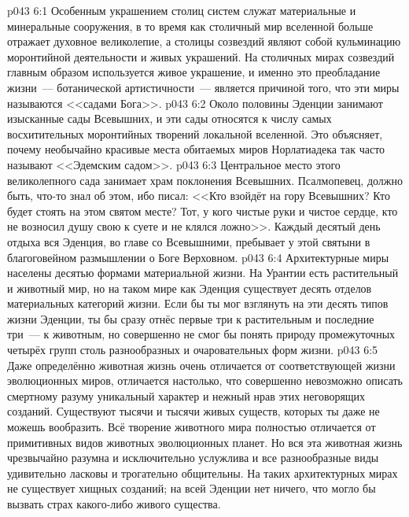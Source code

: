 \vs p043 6:1 Особенным украшением столиц систем служат материальные и минеральные сооружения, в то время как столичный мир вселенной больше отражает духовное великолепие, а столицы созвездий являют собой кульминацию моронтийной деятельности и живых украшений. На столичных мирах созвездий главным образом используется живое украшение, и именно это преобладание жизни~--- ботанической артистичности~--- является причиной того, что эти миры называются <<садами Бога>>.
\vs p043 6:2 \pc Около половины Эденции занимают изысканные сады Всевышних, и эти сады относятся к числу самых восхитительных моронтийных творений локальной вселенной. Это объясняет, почему необычайно красивые места обитаемых миров Норлатиадека так часто называют <<Эдемским садом>>.
\vs p043 6:3 Центральное место этого великолепного сада занимает храм поклонения Всевышних. Псалмопевец, должно быть, что-то знал об этом, ибо писал: <<Кто взойдёт на гору Всевышних? Кто будет стоять на этом святом месте? Тот, у кого чистые руки и чистое сердце, кто не возносил душу свою к суете и не клялся ложно>>. Каждый десятый день отдыха вся Эденция, во главе со Всевышними, пребывает у этой святыни в благоговейном размышлении о Боге Верховном.
\vs p043 6:4 \pc Архитектурные миры населены десятью формами материальной жизни. На Урантии есть растительный и животный мир, но на таком мире как Эденция существует десять отделов материальных категорий жизни. Если бы ты мог взглянуть на эти десять типов жизни Эденции, ты бы сразу отнёс первые три к растительным и последние три~--- к животным, но совершенно не смог бы понять природу промежуточных четырёх групп столь разнообразных и очаровательных форм жизни.
\vs p043 6:5 Даже определённо животная жизнь очень отличается от соответствующей жизни эволюционных миров, отличается настолько, что совершенно невозможно описать смертному разуму уникальный характер и нежный нрав этих неговорящих созданий. Существуют тысячи и тысячи живых существ, которых ты даже не можешь вообразить. Всё творение животного мира полностью отличается от примитивных видов животных эволюционных планет. Но вся эта животная жизнь чрезвычайно разумна и исключительно услужлива и все разнообразные виды удивительно ласковы и трогательно общительны. На таких архитектурных мирах не существует хищных созданий; на всей Эденции нет ничего, что могло бы вызвать страх какого\hyp{}либо живого существа.
